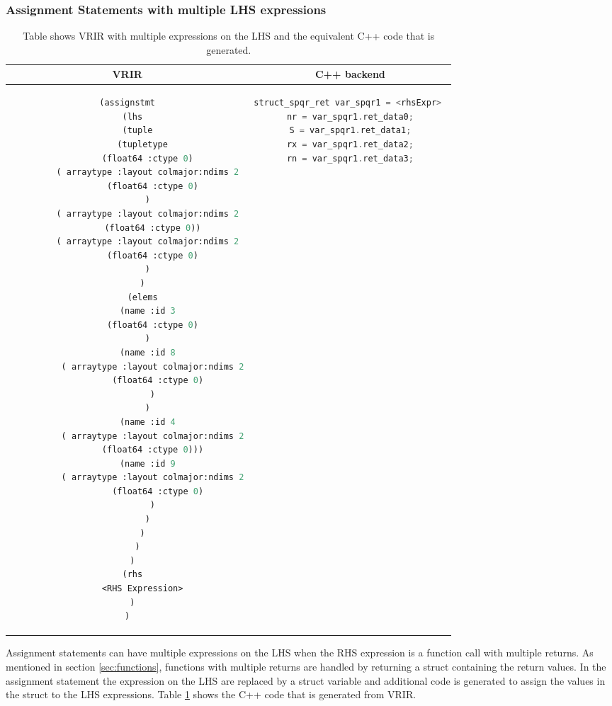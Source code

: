 \subsubsection{Assignment Statements with multiple LHS expressions}
\begin{table}[htbp]
\begin{tabular}{|c|c|}
\hline 
VRIR & C++ backend \\
\hline 
{
\begin{lstlisting}[language=lisp, frame=none, numbers=none]
(assignstmt
  (lhs
    (tuple
      (tupletype
        (float64 :ctype 0)
        ( arraytype :layout colmajor:ndims 2
          (float64 :ctype 0)
        )
        ( arraytype :layout colmajor:ndims 2
          (float64 :ctype 0))
        ( arraytype :layout colmajor:ndims 2
          (float64 :ctype 0)
        )
      )
      (elems
        (name :id 3
          (float64 :ctype 0)
        )
        (name :id 8
          ( arraytype :layout colmajor:ndims 2
            (float64 :ctype 0)
          )
        )
        (name :id 4
          ( arraytype :layout colmajor:ndims 2
            (float64 :ctype 0)))  
        (name :id 9
          ( arraytype :layout colmajor:ndims 2
            (float64 :ctype 0)
          )
        )
      )
    )
  )
  (rhs
      <RHS Expression>
  )
)
\end{lstlisting}
} & 
{
\begin{lstlisting}[language=c,frame=none, numbers=none]
struct_spqr_ret var_spqr1 = <rhsExpr> 
nr = var_spqr1.ret_data0;
S = var_spqr1.ret_data1;
rx = var_spqr1.ret_data2;
rn = var_spqr1.ret_data3;
\end{lstlisting}
} \\
\hline
\end{tabular}
\caption[Assignment with multiple LHS expressions]{Table shows VRIR with multiple expressions on the LHS and the equivalent C++ code that is generated.}
\label{tab:multAssignment}
\end{table}
Assignment statements can have multiple expressions on the LHS when the RHS expression is a function call with multiple returns. As mentioned in section \ref{sec:functions}, functions with multiple returns are handled by returning a struct containing the return values. In the assignment statement the expression on the LHS are replaced by a struct variable and additional code is generated to assign the values in the struct to the LHS expressions. Table \ref{tab:multAssignment} shows the C++ code that is generated from VRIR.


